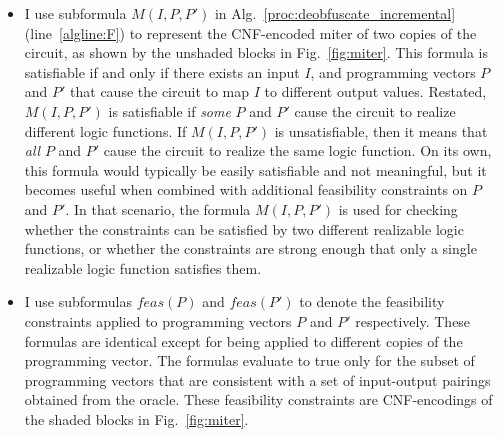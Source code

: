 \documentclass[thesis]{umassthesis}  %
\begin{document}
\begin{itemize}
\item I use subformula $M(I,P,P')$ in Alg.~\ref{proc:deobfuscate_incremental} (line~\ref{algline:F}) to represent the CNF-encoded miter of two copies of the circuit, as shown by the unshaded blocks in Fig.~\ref{fig:miter}. {This formula is satisfiable if and only if there exists an input $I$, and programming vectors $P$ and $P'$ that cause the circuit to map $I$ to different output values. Restated, $M(I,P,P')$ is satisfiable if {\itshape some} $P$ and $P'$ cause the circuit to realize different logic functions. If $M(I,P,P')$ is unsatisfiable, then it means that {\itshape all} $P$ and $P'$ cause the circuit to realize the same logic function. On its own, this formula would typically be easily satisfiable and not meaningful, but it becomes useful when combined with additional feasibility constraints on $P$ and $P'$. In that scenario, the formula $M(I,P,P')$ is used for checking whether the constraints can be satisfied by two different realizable logic functions, or whether the constraints are strong enough that only a single realizable logic function satisfies them. 
 }


\item {I use subformulas $feas(P)$ and $feas(P')$ to denote the feasibility constraints applied to programming vectors $P$ and $P'$ respectively. These formulas are identical except for being applied to different copies of the programming vector. The formulas evaluate to true only for the subset of programming vectors that are consistent with a set of input-output pairings obtained from the oracle. These feasibility constraints are CNF-encodings of the shaded blocks in Fig.~\ref{fig:miter}}. 


\end{itemize}

\end{document}
